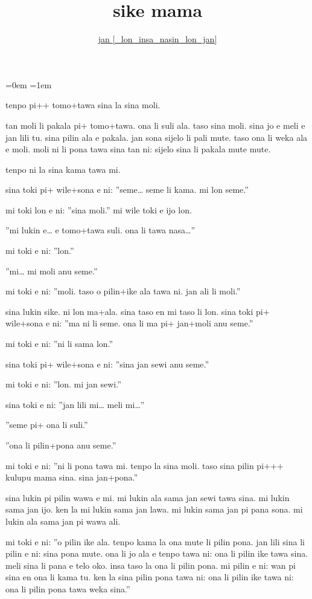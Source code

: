 \documentclass{article}
\title{sike mama}
\author{\href{https://blinry.org/sike-mama/}{jan {[}\_lon\_insa\_nasin\_lon\_jan{]}}}
\date{}
\begin{document}
\parindent=0em
\parskip=1em
\large

\maketitle

tenpo pi++ tomo+tawa sina la sina moli.

tan moli li pakala pi+ tomo+tawa. ona li suli ala. taso sina moli. sina jo e meli e jan lili tu. sina pilin ala e pakala. jan sona sijelo li pali mute. taso ona li weka ala e moli. moli ni li pona tawa sina tan ni: sijelo sina li pakala mute mute.

tenpo ni la sina kama tawa mi.

sina toki pi+ wile+sona e ni: ''seme… seme li kama. mi lon seme.''

mi toki lon e ni: ''sina moli.'' mi wile toki e ijo lon.

''mi lukin e… e tomo+tawa suli. ona li tawa nasa…''

mi toki e ni: ''lon.''

''mi… mi moli anu seme.''

mi toki e ni: ''moli. taso o pilin+ike ala tawa ni. jan ali li moli.''

sina lukin sike. ni lon ma+ala. sina taso en mi taso li lon. sina toki pi+ wile+sona e ni: ''ma ni li seme. ona li ma pi+ jan+moli anu seme.''

mi toki e ni: ''ni li sama lon.''

sina toki pi+ wile+sona e ni: ''sina jan sewi anu seme.''

mi toki e ni: ''lon. mi jan sewi.''

sina toki e ni: ''jan lili mi… meli mi…''

''seme pi+ ona li suli.''

''ona li pilin+pona anu seme.''

mi toki e ni: ''ni li pona tawa mi. tenpo la sina moli. taso sina pilin pi+++ kulupu mama sina. sina jan+pona.''

sina lukin pi pilin wawa e mi. mi lukin ala sama jan sewi tawa sina. mi lukin sama jan ijo. ken la mi lukin sama jan lawa. mi lukin sama jan pi pana sona. mi lukin ala sama jan pi wawa ali.

mi toki e ni: ''o pilin ike ala. tenpo kama la ona mute li pilin pona. jan lili sina li pilin e ni: sina pona mute. ona li jo ala e tenpo tawa ni: ona li pilin ike tawa sina. meli sina li pana e telo oko. insa taso la ona li pilin pona. mi pilin e ni: wan pi sina en ona li kama tu. ken la sina pilin pona tawa ni: ona li pilin ike tawa ni: ona li pilin pona tawa weka sina.''
\end{document}
